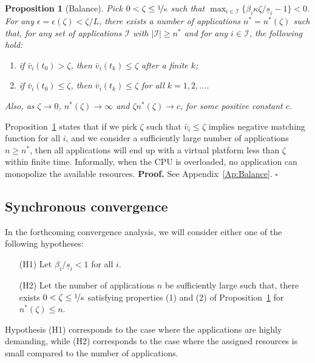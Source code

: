 \documentclass[letter,11pt]{article}
\newtheorem{proposition}{Proposition}[section]
\newenvironment{proof}{\textbf{Proof.}}{$\square$\\}
\begin{document}
\begin{proposition}[Balance] \label{Pr:Balance}
Pick $0<\zeta\leq\nicefrac{1}{\kappa}$ such that $\max_{i\in\mathcal{I}}\{\beta_i\kappa\zeta/\underline{s}_i-1\} < 0$. For any $\epsilon=\epsilon(\zeta)<\zeta/L$, there exists a number of applications $n^*=n^*(\zeta)$ such that, for any set of applications $\mathcal{I}$ with ${\left\vert {\mathcal{I}} \right\vert}\geq{n^*}$ and for any $i\in\mathcal{I}$, the following hold: 
\begin{enumerate}
\item if ${\bar{v}}_i(t_0)>\zeta$, then ${\bar{v}}_i(t_k)\leq \zeta$ after a finite $k$; 
\item if ${\bar{v}}_i(t_0)\leq\zeta$, then ${\bar{v}}_i(t_k)\leq\zeta$ for all $k=1,2,...$.
\end{enumerate}
Also, as $\zeta\to{0}$, $n^*(\zeta)\to \infty$ and $\zeta n^*(\zeta)\to{c}$, for some positive constant $c$.
\end{proposition}
Proposition~\ref{Pr:Balance} states that if we pick $\zeta$ such that ${\bar{v}}_i\leq\zeta$ implies negative matching function for all $i$, and we consider a sufficiently large number of applications $n\geq{n^*}$, then all applications will end up with a virtual platform less than $\zeta$ within finite time. Informally, when the CPU is overloaded, no application can monopolize the available resources.
\begin{proof}
See Appendix~\ref{Ap:Balance}.
\end{proof}

\subsection{Synchronous convergence}		\label{sec:SynchronousConvergence}

In the forthcoming convergence analysis, we will consider either one of the following hypotheses:
\begin{enumerate}
\item[(H1)] Let $\beta_i/\underline{s}_i < 1$ for all $i$.
\item[(H2)] Let the number of applications $n$ be sufficiently large such that, there exists $0<\zeta\leq\nicefrac{1}{\kappa}$ satisfying properties (1) and (2) of Proposition~\ref{Pr:Balance} for $n^*(\zeta)\leq{n}$.
\end{enumerate}
Hypothesis (H1) corresponds to the case where the applications are highly demanding, while (H2) corresponds to the case where the assigned resources is small compared to the number of applications. 
\end{document}
